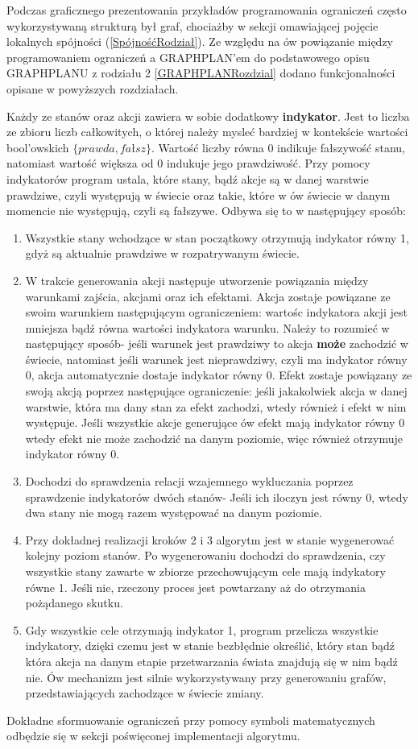     Podczas graficznego prezentowania przykładów programowania ograniczeń często wykorzystywaną strukturą był graf, chociażby w sekcji omawiającej 
    pojęcie lokalnych spójności (\ref{SpójnośćRodział}). Ze względu na ów powiązanie między programowaniem ograniczeń a GRAPHPLAN'em do podstawowego opisu GRAPHPLANU z rodziału 2 
    \ref{GRAPHPLANRozdzial} dodano funkcjonalności opisane w powyższych rozdziałach. 

    Każdy ze stanów oraz akcji zawiera w sobie dodatkowy \textbf{indykator}. Jest to liczba ze zbioru liczb całkowitych, o której 
    należy mysleć bardziej w kontekście wartości bool'owskich $\{prawda,fałsz\}$. Wartość liczby równa 0 indikuje fałszywość stanu, natomiast wartość większa od 0 indukuje jego
    prawdziwość. Przy pomocy indykatorów program ustala, które stany, bądź akcje 
    są w danej warstwie prawdziwe, czyli występują w świecie oraz takie, które w ów świecie w danym momencie nie występują, czyli są fałszywe. 
    Odbywa się to w następujący sposób:
    \begin{enumerate}
        \item Wszystkie stany wchodzące w stan początkowy otrzymują indykator równy 1, gdyż są aktualnie prawdziwe 
        w rozpatrywanym świecie.
        \item W trakcie generowania akcji następuje utworzenie powiązania między warunkami zajścia, akcjami oraz ich efektami.
        Akcja zostaje powiązane ze swoim warunkiem następującym ograniczeniem: wartośc indykatora akcji jest mniejsza bądź równa wartości 
        indykatora warunku. Należy to rozumieć w następujący sposób- jeśli warunek jest prawdziwy to akcja \textbf{może} zachodzić w świecie, natomiast 
        jeśli warunek jest nieprawdziwy, czyli ma indykator równy 0, akcja automatycznie dostaje indykator równy 0.
        Efekt zostaje powiązany ze swoją akcją poprzez następujące ograniczenie: jeśli jakakolwiek akcja w danej warstwie, 
        która ma dany stan za efekt zachodzi, wtedy również i efekt w nim występuje. Jeśli wszystkie akcje generujące ów efekt mają indykator równy 0 
        wtedy efekt nie może zachodzić na danym poziomie, więc również otrzymuje indykator równy 0.
        \item Dochodzi do sprawdzenia relacji wzajemnego wykluczania poprzez sprawdzenie indykatorów dwóch stanów- Jeśli ich iloczyn jest równy 0, wtedy 
        dwa stany nie mogą razem występować na danym poziomie.
        \item Przy dokładnej realizacji kroków 2 i 3 algorytm jest w stanie wygenerować kolejny poziom stanów. Po wygenerowaniu 
        dochodzi do sprawdzenia, czy wszystkie stany zawarte w zbiorze przechowującym cele mają indykatory równe 1. Jeśli nie, 
        rzeczony proces jest powtarzany aż do otrzymania pożądanego skutku.
        \item Gdy wszystkie cele otrzymają indykator 1, program przelicza wszystkie indykatory, dzięki czemu jest w stanie bezbłędnie określić, który 
        stan bądź która akcja na danym etapie przetwarzania świata znajdują się w nim bądź nie. Ów mechanizm jest silnie wykorzystywany 
        przy generowaniu grafów, przedstawiających zachodzące w świecie zmiany.
    \end{enumerate}

    Dokładne sformuowanie ograniczeń przy pomocy symboli matematycznych odbędzie się w sekcji poświęconej implementacji algorytmu.
    

